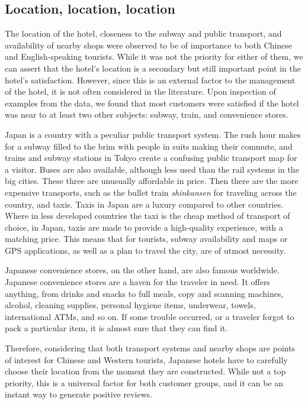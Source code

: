 \documentclass[smallextended,natbib]{svjour3}       %
\begin{document}
\subsection{Location, location, location}\label{disc:location}

The location of the hotel, closeness to the subway and public transport, and availability of nearby shops were observed to be of importance to both Chinese and English-speaking tourists. While it was not the priority for either of them, we can assert that the hotel's location is a secondary but still important point in the hotel's satisfaction. However, since this is an external factor to the management of the hotel, it is not often considered in the literature. Upon inspection of examples from the data, we found that most customers were satisfied if the hotel was near to at least two other subjects: subway, train, and convenience stores. 

Japan is a country with a peculiar public transport system. The rush hour makes for a subway filled to the brim with people in suits making their commute, and trains and subway stations in Tokyo create a confusing public transport map for a visitor. Buses are also available, although less used than the rail systems in the big cities. These three are unusually affordable in price. Then there are the more expensive transports, such as the bullet train \textit{shinkansen} for traveling across the country, and taxis. Taxis in Japan are a luxury compared to other countries. Where in less developed countries the taxi is the cheap method of transport of choice, in Japan, taxis are made to provide a high-quality experience, with a matching price. This means that for tourists, subway availability and maps or GPS applications, as well as a plan to travel the city, are of utmost necessity.

Japanese convenience stores, on the other hand, are also famous worldwide. Japanese convenience stores are a haven for the traveler in need. It offers anything, from drinks and snacks to full meals, copy and scanning machines, alcohol, cleaning supplies, personal hygiene items, underwear, towels, international ATMs, and so on. If some trouble occurred, or a traveler forgot to pack a particular item, it is almost sure that they can find it.

Therefore, considering that both transport systems and nearby shops are points of interest for Chinese and Western tourists, Japanese hotels have to carefully choose their location from the moment they are constructed. While not a top priority, this is a universal factor for both customer groups, and it can be an instant way to generate positive reviews.
\end{document}
